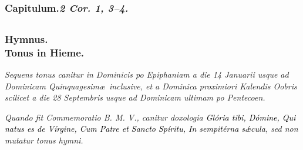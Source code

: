 \documentclass[12pt]{article} %
\newenvironment{rubric}{\color{benred8} \itshape \leftskip 0in \setlength{\parindent}{0.25in}}{\vspace{2 mm}}
\def\capitulumSpace{\hspace{20 mm}}
\begin{document}

\subsection*{}

\subsubsection*{Capitulum.\capitulumSpace \emph{2 Cor. 1, 3--4.}}

\label{DominicaCapitulum}



\subsection*{}

\subsubsection*{Hymnus.\\Tonus in Hieme.}

\begin{rubric}
Sequens tonus canitur in Dominicis po Epiphaniam a die 14 Januarii usque ad Dominicam Quinquagesim\ae\ inclusive, et a Dominica proximiori Kalendis Oobris scilicet a die 28 Septembris usque ad Dominicam ultimam po Pentecoen.

\end{rubric}


\gresetfirstlineaboveinitial{\small \textsc{ \textbf{\textcolor{benred8}{IV}}}}{\small \textsc{ \textbf{\textcolor{benred8}{IV}}}}

\begin{rubric}
Quando fit Commemoratio B. M. V., canitur doxologia \emph{\textcolor{black}{Gl\'{o}ria tibi, D\'{o}mine, Qui natus es de V\'{i}rgine, Cum Patre \emph{et} Sancto Sp\'{i}ritu, In sempit\'{e}rna s\'{\ae}cula}}, sed non mutatur tonus hymni.

\end{rubric}
\end{document}
